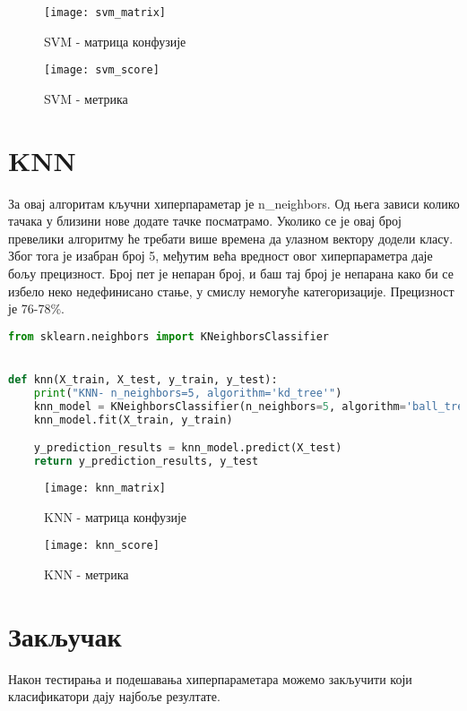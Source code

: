 \documentclass[11pt]{article} %
\begin{document}
\begin{figure}[h]
\centering
	\texttt{[image: svm\_matrix]} 
	\caption{SVM - матрица конфузије} 
\end{figure}

\begin{figure}[h]
\centering
	\texttt{[image: svm\_score]} 
	\caption{SVM - метрика} 
\end{figure}



\section{KNN}
За овај алгоритам кључни хиперпараметар је n\_neighbors. Од њега зависи колико тачака у близини нове додате тачке посматрамо. Уколико се је овај број превелики алгоритму ће требати више времена да улазном вектору додели класу. Због тога је изабран број 5, међутим већа вредност овог хиперпараметра даје бољу прецизност. Број пет је непаран број, и баш тај број је непарана како би се избело неко недефинисано стање, у смислу немогуће категоризације.
	Прецизност је 76-78\%.
	
\begin{lstlisting}[language=Python,title=Пример 9. KNN /classificators/k\_nearest\_n.py ]
from sklearn.neighbors import KNeighborsClassifier


def knn(X_train, X_test, y_train, y_test):
    print("KNN- n_neighbors=5, algorithm='kd_tree'")
    knn_model = KNeighborsClassifier(n_neighbors=5, algorithm='ball_tree', p=2) # algorithm='ball_tree')
    knn_model.fit(X_train, y_train)

    y_prediction_results = knn_model.predict(X_test)
    return y_prediction_results, y_test
\end{lstlisting}

\begin{figure}[h]
\centering
	\texttt{[image: knn\_matrix]} 
	\caption{KNN - матрица конфузије} 
\end{figure}

\begin{figure}[h]
\centering
	\texttt{[image: knn\_score]} 
	\caption{KNN - метрика} 
\end{figure}

\newpage
\section{Закључак}
Након тестирања и подешавања хиперпараметара можемо закључити који класификатори дају најбоље резултате.
\end{document}
